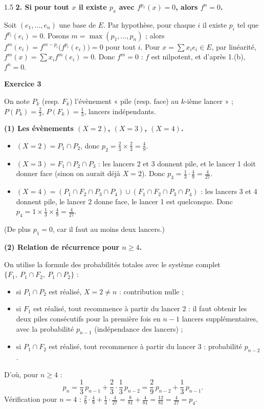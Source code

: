 \documentclass[12pt]{article}
\begin{document}
\begin{spacing}{1.5}
\textbf{2. Si pour tout $x$ il existe $p_x$ avec $f^{p_x}(x)=0$, alors $f^n=0$.}

Soit $(e_1,\dots,e_n)$ une base de $E$. Par hypothèse, pour chaque $i$ il existe $p_i$ tel que $f^{p_i}(e_i)=0$. Posons $m=\max(p_1,\dots,p_n)$ ; alors $f^m(e_i)=f^{m-p_i}\big(f^{p_i}(e_i)\big)=0$ pour tout $i$. Pour $x=\sum x_ie_i\in E$, par linéarité, $f^m(x)=\sum x_if^m(e_i)=0$. Donc $f^m=0$ : $f$ est nilpotent, et d'après 1.(b), $f^n=0$.


\medskip\textbf{Exercice 3}

On note $P_k$ (resp. $F_k$) l'évènement « pile (resp. face) au $k$-ième lancer » ; $P(P_k)=\frac23$, $P(F_k)=\frac13$, lancers indépendants.

\textbf{(1) Les évènements $(X=2)$, $(X=3)$, $(X=4)$.}
\begin{itemize}
\item $(X=2)=P_1\cap P_2$, donc $p_2=\frac23\times\frac23=\boxed{\frac49}$.
\item $(X=3)=F_1\cap P_2\cap P_3$ : les lancers 2 et 3 donnent pile, et le lancer 1 doit donner face (sinon on aurait déjà $X=2$). Donc $p_3=\frac13\cdot\frac49=\boxed{\frac4{27}}$.
\item $(X=4)=(P_1\cap F_2\cap P_3\cap P_4)\cup(F_1\cap F_2\cap P_3\cap P_4)$ : les lancers 3 et 4 donnent pile, le lancer 2 donne face, le lancer 1 est quelconque. Donc $p_4=1\times\frac13\times\frac49=\boxed{\frac4{27}}$.
\end{itemize}
(De plus $p_1=0$, car il faut au moins deux lancers.)

\textbf{(2) Relation de récurrence pour $n\ge4$.}

On utilise la formule des probabilités totales avec le système complet $\{F_1,\ P_1\cap F_2,\ P_1\cap P_2\}$ :
\begin{itemize}
\item si $P_1\cap P_2$ est réalisé, $X=2\neq n$ : contribution nulle ;
\item si $F_1$ est réalisé, tout recommence à partir du lancer 2 : il faut obtenir les deux piles consécutifs pour la première fois en $n-1$ lancers supplémentaires, avec la probabilité $p_{n-1}$ (indépendance des lancers) ;
\item si $P_1\cap F_2$ est réalisé, tout recommence à partir du lancer 3 : probabilité $p_{n-2}$.
\end{itemize}
D'où, pour $n\ge4$ :
\[
p_n=\frac13\,p_{n-1}+\frac23\cdot\frac13\,p_{n-2}=\frac29\,p_{n-2}+\frac13\,p_{n-1}.
\]
Vérification pour $n=4$ : $\frac29\cdot\frac49+\frac13\cdot\frac4{27}=\frac{8}{81}+\frac{4}{81}=\frac{12}{81}=\frac4{27}=p_4$.


\end{spacing}
\end{document}
